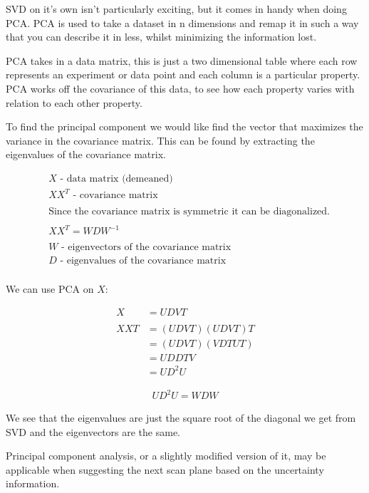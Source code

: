 \documentclass[
  oneside,
  11pt, a4paper,
  footinclude=true,
  headinclude=true,
  cleardoublepage=empty
]{scrbook}
\begin{document}
SVD on it’s own isn’t particularly exciting, but it comes in handy when doing PCA. PCA is used to take a dataset in n dimensions and remap it in such a way that you can describe it in less, whilst minimizing the information lost.

PCA takes in a data matrix, this is just a two dimensional table where each row represents an experiment or data point and each column is a particular property. PCA works off the covariance of this data, to see how each property varies with relation to each other property.

To find the principal component we would like find the vector that maximizes the variance in the covariance matrix. This can be found by extracting the eigenvalues of the covariance matrix.

\begin{align*}
& X \text{ - data matrix (demeaned)} \\
& XX^{T} \text{ - covariance matrix} \\
& \\
& \text{Since the covariance matrix is symmetric it can be diagonalized.} \\
& \\
& XX^{T} = WDW^{-1} \\
& \\
& W \text{ - eigenvectors of the covariance matrix} \\
& D \text{ - eigenvalues of the covariance matrix} \\
\end{align*}

We can use PCA on $X$:

\begin{align*}
X &= UDVT \\
& \\
XXT &= (UDVT)(UDVT)T \\
	&= (UDVT)(VDTUT) \\
	&= UDDTV \\
	&= UD^{2}U
\end{align*}
	
\begin{align*}
UD^{2}U = WDW
\end{align*}

We see that the eigenvalues are just the square root of the diagonal we get from SVD and the eigenvectors are the same.

Principal component analysis, or a slightly modified version of it, may be applicable when suggesting the next scan plane based on the uncertainty information.
\end{document}
